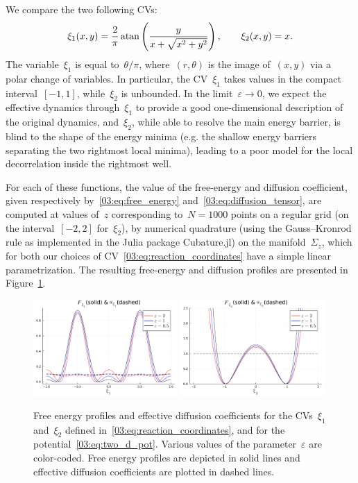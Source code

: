 We compare  the two following CVs:
\begin{equation}
    \label{03:eq:reaction_coordinates}
    \xi_1(x,y) = \frac 2\pi \atan\left(\frac{y}{x+\sqrt{x^2+y^2}}\right),\qquad \xi_2(x,y)=x.
\end{equation}
The variable~$\xi_1$ is equal to~$\theta/\pi$, where~$(r,\theta)$ is the image of~$(x,y)$ via a polar change of variables. In particular, the CV~$\xi_1$ takes values in the compact interval~$[-1,1]$, while~$\xi_2$ is unbounded. In the limit~$\varepsilon\to 0$, we expect the effective dynamics through~$\xi_1$ to provide a good one-dimensional description of the original dynamics, and~$\xi_2$, while able to resolve the main energy barrier, is blind to the shape of the energy minima (e.g. the shallow energy barriers separating the two rightmost local minima), leading to a poor model for the local decorrelation inside the rightmost well. 

For each of these functions, the value of the free-energy and diffusion coefficient, given respectively by~\eqref{03:eq:free_energy} and~\eqref{03:eq:diffusion_tensor}, are computed at values of~$z$ corresponding to~$N=1000$ points on a regular grid (on the interval~$[-2,2]$ for~$\xi_2$),  by numerical quadrature (using the Gauss--Kronrod rule as implemented in the Julia package Cubature.jl) on the manifold~$\Sigma_z$, which for both our choices of CV~\eqref{03:eq:reaction_coordinates} have a simple linear parametrization. The resulting free-energy and diffusion profiles are presented in Figure~\ref{03:fig:fd_plot}.

\begin{figure}
    \centering
    \includegraphics[width=0.49\textwidth]{figures/03/2d/fd_plot_xi1.pdf}
    \includegraphics[width=0.49\textwidth]{figures/03/2d/fd_plot_xi2.pdf}
    \caption[]{Free energy profiles and effective diffusion coefficients for the CVs~$\xi_1$ and~$\xi_2$ defined in~\eqref{03:eq:reaction_coordinates}, and for the potential~\eqref{03:eq:two_d_pot}. Various values of the parameter~$\varepsilon$ are color-coded. Free energy profiles are depicted in solid lines and effective diffusion coefficients are plotted in dashed lines.}
    \label{03:fig:fd_plot}
\end{figure}

